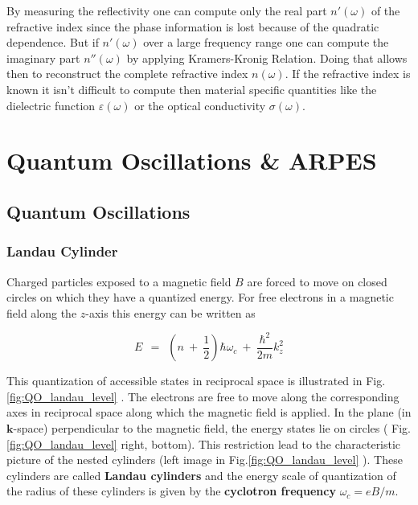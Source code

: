 \documentclass[10pt]{report}
\numberwithin{equation}{chapter}
\newcommand{\myRef}[1]{
  Fig.\ref{#1}
}
\newcommand{\vc}[1]{ %
  \mathbf{#1}
}
\begin{document}
By measuring the reflectivity one can compute only the real part $n'(\omega)$ of the refractive index since the phase information is lost because of the quadratic dependence. But if $n'(\omega)$ over a large frequency range one can compute the imaginary part $n''(\omega)$ by applying Kramers-Kronig Relation. Doing that allows then to reconstruct the complete refractive index $n(\omega)$. If the refractive index is known it isn't difficult to compute then material specific quantities like the dielectric function $\varepsilon(\omega)$ or the optical conductivity $\sigma(\omega)$.

%

\chapter{Quantum Oscillations \& ARPES}



%
\section{Quantum Oscillations}

\subsection{Landau Cylinder}

Charged particles exposed to a magnetic field $B$ are forced to move on closed circles on which they have a quantized energy. For free electrons in a magnetic field along the $z$-axis this energy can be written as

\begin{equation}
  E ~~=~~ \left( n ~+~ \frac{1}{2} \right) \hbar \omega_c ~+~ \frac{\hbar^2}{2m} k_z^2
\end{equation}


This quantization of accessible states in reciprocal space is illustrated in \myRef{fig:QO_landau_level}. 
The electrons are free to move along the corresponding axes in reciprocal space along which the magnetic field is applied. In the plane (in $\vc{k}$-space) perpendicular to the magnetic field, the energy states lie on circles (\myRef{fig:QO_landau_level} right, bottom). This restriction lead to the characteristic picture of the nested cylinders (left image in \myRef{fig:QO_landau_level}). These cylinders are called \textbf{Landau cylinders} and the energy scale of quantization of the radius of these cylinders is given by the \textbf{cyclotron frequency} $\omega_c = eB/m$.
\end{document}
